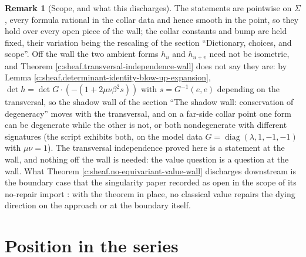 \documentclass[11pt]{article}
\theoremstyle{definition}
\newtheorem{remark}[theorem]{Remark}
\theoremstyle{plain}
\providecommand{\Sig}{}\renewcommand{\Sig}{\Sigma}
\begin{document}
\begin{remark}[Scope, and what this discharges]\label{c:note.sheaf.scope-what-discharges}
The statements are pointwise on $\Sig$, every formula rational in the collar data and hence smooth in the point, so they hold over every open piece of the wall; the collar constants and bump are held fixed, their variation being the rescaling of the section ``Dictionary, choices, and scope''. Off the wall the two ambient forms $h_u$ and $h_{u+v}$ need not be isometric, and Theorem \ref{c:sheaf.transversal-independence-wall} does not say they are: by Lemma \ref{c:sheaf.determinant-identity-blow-up-expansion}, $\det h = \det G \cdot (-(1 + 2\mu\nu\beta^2 s))$ with $s = G^{-1}(e,e)$ depending on the transversal, so the shadow wall of the section ``The shadow wall: conservation of degeneracy'' moves with the transversal, and on a far-side collar point one form can be degenerate while the other is not, or both nondegenerate with different signatures (the script exhibits both, on the model data $G = \operatorname{diag}(\lambda, 1, -1, -1)$ with $\mu\nu = 1$). The transversal independence proved here is a statement at the wall, and nothing off the wall is needed: the value question is a question at the wall. What Theorem \ref{c:sheaf.no-equivariant-value-wall} discharges downstream is the boundary case that the singularity paper recorded as open in the scope of its no-repair import \cite{ButlerT5}: with the theorem in place, no classical value repairs the dying direction on the approach or at the boundary itself.
\end{remark}

\section{Position in the series}
\end{document}
